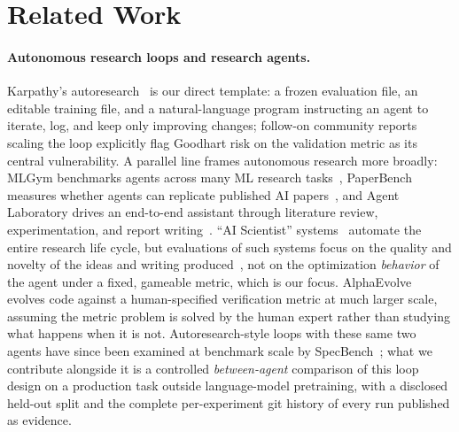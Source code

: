 \documentclass[runningheads]{llncs}
\begin{document}
\section{Related Work}
\label{sec:related}

\paragraph{Autonomous research loops and research agents.}
Karpathy's autoresearch~\cite{karpathy2026autoresearch} is our direct
template: a frozen evaluation file, an editable training file, and a
natural-language program instructing an agent to iterate, log, and keep
only improving changes; follow-on community reports scaling the loop
explicitly flag Goodhart risk on the validation metric as its central
vulnerability. A parallel line frames autonomous research more broadly:
MLGym benchmarks agents across many ML research
tasks~\cite{nathani2025mlgym}, PaperBench measures whether agents can
replicate published AI papers~\cite{starace2025paperbench}, and Agent
Laboratory drives an end-to-end assistant through literature review,
experimentation, and report writing~\cite{schmidgall2025agentlab}. ``AI
Scientist'' systems~\cite{sakana2024aiscientist} automate the entire
research life cycle, but evaluations of such systems focus on the quality
and novelty of the ideas and writing produced~\cite{beel2025evaluating},
not on the optimization \emph{behavior} of the agent under a fixed,
gameable metric, which is our focus. AlphaEvolve~\cite{novikov2025alphaevolve}
evolves code against a human-specified verification metric at much larger
scale, assuming the metric problem is solved by the human expert rather
than studying what happens when it is not. Autoresearch-style loops with
these same two agents have since been examined at benchmark scale by
SpecBench~\cite{zhao2026specbench}; what we contribute alongside it is a
controlled \emph{between-agent} comparison of this loop design on a
production task outside language-model pretraining, with a disclosed
held-out split and the complete per-experiment git history of every run
published as evidence.
\end{document}
